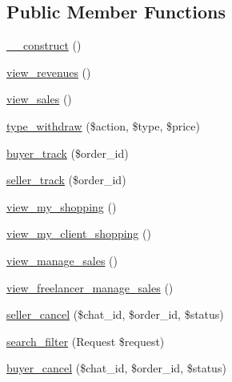 \subsection*{Public Member Functions}
\begin{DoxyCompactItemize}
\item 
\mbox{\hyperlink{class_responsive_1_1_http_1_1_controllers_1_1_job_sales_controller_a095c5d389db211932136b53f25f39685}{\+\_\+\+\_\+construct}} ()
\item 
\mbox{\hyperlink{class_responsive_1_1_http_1_1_controllers_1_1_job_sales_controller_a6ab40143e21a521f539feafe14307097}{view\+\_\+revenues}} ()
\item 
\mbox{\hyperlink{class_responsive_1_1_http_1_1_controllers_1_1_job_sales_controller_a9c4ccb19926f4a518484fd42bb345272}{view\+\_\+sales}} ()
\item 
\mbox{\hyperlink{class_responsive_1_1_http_1_1_controllers_1_1_job_sales_controller_a312ebafadbee3f2196f02445219f3c66}{type\+\_\+withdraw}} (\$action, \$type, \$price)
\item 
\mbox{\hyperlink{class_responsive_1_1_http_1_1_controllers_1_1_job_sales_controller_a0c07b1ea236beecb7f99bc6b37eeb6f5}{buyer\+\_\+track}} (\$order\+\_\+id)
\item 
\mbox{\hyperlink{class_responsive_1_1_http_1_1_controllers_1_1_job_sales_controller_a43da16ddb7b2a42a082944a89080922f}{seller\+\_\+track}} (\$order\+\_\+id)
\item 
\mbox{\hyperlink{class_responsive_1_1_http_1_1_controllers_1_1_job_sales_controller_af9d02e3dd4c9de85335b63e07e271fc7}{view\+\_\+my\+\_\+shopping}} ()
\item 
\mbox{\hyperlink{class_responsive_1_1_http_1_1_controllers_1_1_job_sales_controller_a4b756bcdd0c878126d2aaf1c7c4c7c46}{view\+\_\+my\+\_\+client\+\_\+shopping}} ()
\item 
\mbox{\hyperlink{class_responsive_1_1_http_1_1_controllers_1_1_job_sales_controller_a369ca7780b30f19528a574b0bae35c72}{view\+\_\+manage\+\_\+sales}} ()
\item 
\mbox{\hyperlink{class_responsive_1_1_http_1_1_controllers_1_1_job_sales_controller_a06fea9782c9683f602d3e9b2711b0b9a}{view\+\_\+freelancer\+\_\+manage\+\_\+sales}} ()
\item 
\mbox{\hyperlink{class_responsive_1_1_http_1_1_controllers_1_1_job_sales_controller_a54c733ab6d5dfcff2ae4c96bd2cba854}{seller\+\_\+cancel}} (\$chat\+\_\+id, \$order\+\_\+id, \$status)
\item 
\mbox{\hyperlink{class_responsive_1_1_http_1_1_controllers_1_1_job_sales_controller_a3943fd5c1dc7b10adc4f2b77b67b5860}{search\+\_\+filter}} (Request \$request)
\item 
\mbox{\hyperlink{class_responsive_1_1_http_1_1_controllers_1_1_job_sales_controller_ae6476cb9150ea64e6ace4db49772bdd3}{buyer\+\_\+cancel}} (\$chat\+\_\+id, \$order\+\_\+id, \$status)
\end{DoxyCompactItemize}
